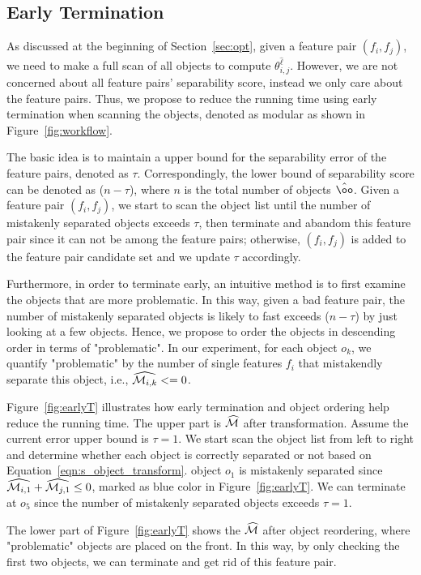 \subsection{Early Termination} \label{ssec:earlyT}
As discussed at the beginning of Section~\ref{sec:opt}, given a feature pair $(f_i,f_j)$, we need to make a full scan of all objects to compute $\theta_{i,j}^{\hat{\ell}}$. However, we are not concerned about all feature pairs' separability score, instead we only care about the \topk feature pairs. Thus, we propose to reduce the running time using early termination when scanning the objects, denoted as \earlyT modular as shown in Figure~\ref{fig:workflow}.

 The basic idea is to maintain a upper bound for the separability error of the \topk feature pairs, denoted as $\tau$. Correspondingly, the lower bound of separability score can be denoted as ($n-\tau$), where $n$ is the total number of objects $\hat{\oo}$. Given a feature pair $(f_i,f_j)$, we start to scan the object list until the number of mistakenly separated objects exceeds $\tau$, then terminate and abandom this feature pair since it can not be among the \topk feature pairs; otherwise, $(f_i,f_j)$ is added to the feature pair candidate set and we update $\tau$ accordingly.

 Furthermore, in order to terminate early, an intuitive method is to first examine the objects that are more problematic. In this way, given a bad feature pair, the number of mistakenly separated objects is likely to fast exceeds ($n-\tau$) by just looking at a few objects. Hence, we propose to order the objects in descending order in terms of "problematic". In our experiment, for each object $o_k$, we quantify "problematic" by the number of single features $f_i$ that mistakendly separate this object, i.e., $\widehat{\mm_{i,k}}<=0$.

\begin{example}
Figure~\ref{fig:earlyT} illustrates how early termination and object ordering help reduce the running time. The upper part is $\widehat{\mm}$ after transformation. Assume the current error upper bound is $\tau=1$. We start scan the object list from left to right and determine whether each object is correctly separated or not based on Equation~\ref{eqn:s_object_transform}. object $o_1$ is mistakenly separated since $\widehat{\mm_{i,1}}+\widehat{\mm_{j,1}}\leq0$, marked as blue color in Figure~\ref{fig:earlyT}. We can terminate at $o_5$ since the number of mistakenly separated objects exceeds $\tau=1$.

The lower part of Figure~\ref{fig:earlyT} shows the $\widehat{\mm}$ after object reordering, where "problematic" objects are placed on the front. In this way, by only checking the first two objects, we can terminate and get rid of this feature pair.
\end{example}

